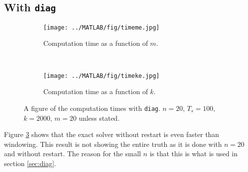 \subsection{With \texttt{diag}}
\begin{figure}[H]
        \centering
        \begin{subfigure}[b]{0.45\textwidth}
                \texttt{[image: ../MATLAB/fig/timeme.jpg]}
                \caption{ Computation time as a function of $m$. }
                \label{fig:timeme}
        \end{subfigure}
        ~
        \begin{subfigure}[b]{0.45\textwidth}
                \texttt{[image: ../MATLAB/fig/timeke.jpg]}
                \caption{ Computation time as a function of $k$. }
                \label{fig:timeke}
        \end{subfigure}
        \caption{ A figure of the computation times with \texttt{diag}. $n = 20$, $T_s = 100$, $k = 2000$, $m = 20$ unless stated. }
        \label{fig:time3}
\end{figure}
Figure \ref{fig:time3} shows that the exact solver without restart is even faster than windowing. This result is not showing the entire truth as it is done with $n = 20$ and without restart. The reason for the small $n$ is that this is what is used in section \ref{sec:diag}. 